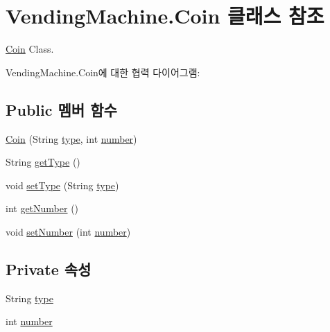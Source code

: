 \hypertarget{class_vending_machine_1_1_coin}{}\section{Vending\+Machine.\+Coin 클래스 참조}
\label{class_vending_machine_1_1_coin}


\hyperlink{class_vending_machine_1_1_coin}{Coin} Class.  




Vending\+Machine.\+Coin에 대한 협력 다이어그램\+:
\subsection*{Public 멤버 함수}
\begin{DoxyCompactItemize}
\item 
\hyperlink{class_vending_machine_1_1_coin_ae79d96395b5532ecfc15b17b674b4b6d}{Coin} (String \hyperlink{class_vending_machine_1_1_coin_a7cd315b148100dbe6872b2afd2220617}{type}, int \hyperlink{class_vending_machine_1_1_coin_adb1775268de98fd4d7ebd3e3b451ad90}{number})
\item 
String \hyperlink{class_vending_machine_1_1_coin_a722b98c9f805270288933fe623dbc062}{get\+Type} ()
\item 
void \hyperlink{class_vending_machine_1_1_coin_a779736061cda6bc4a0bb6579ae4ea07a}{set\+Type} (String \hyperlink{class_vending_machine_1_1_coin_a7cd315b148100dbe6872b2afd2220617}{type})
\item 
int \hyperlink{class_vending_machine_1_1_coin_aa7f5f959561a7de17aef47881e7584a1}{get\+Number} ()
\item 
void \hyperlink{class_vending_machine_1_1_coin_a7a902ab04924cad47753387d2f93a742}{set\+Number} (int \hyperlink{class_vending_machine_1_1_coin_adb1775268de98fd4d7ebd3e3b451ad90}{number})
\end{DoxyCompactItemize}
\subsection*{Private 속성}
\begin{DoxyCompactItemize}
\item 
String \hyperlink{class_vending_machine_1_1_coin_a7cd315b148100dbe6872b2afd2220617}{type}
\item 
int \hyperlink{class_vending_machine_1_1_coin_adb1775268de98fd4d7ebd3e3b451ad90}{number}
\end{DoxyCompactItemize}


